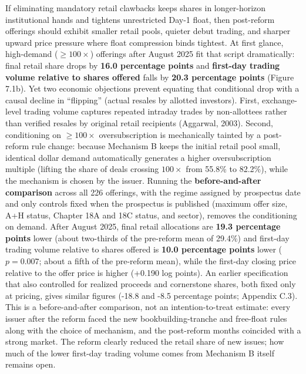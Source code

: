 \documentclass[11pt,letterpaper]{article}
\begin{document}
If eliminating mandatory retail clawbacks keeps shares in longer-horizon institutional hands and tightens unrestricted Day-1 float, then post-reform offerings should exhibit smaller retail pools, quieter debut trading, and sharper upward price pressure where float compression binds tightest. At first glance, high-demand ($\ge 100\times$) offerings after August 2025 fit that script dramatically: final retail share drops by \textbf{16.0 percentage points} and \textbf{first-day trading volume relative to shares offered} falls by \textbf{20.3 percentage points} (Figure 7.1b). Yet two economic objections prevent equating that conditional drop with a causal decline in ``flipping'' (actual resales by allotted investors). First, exchange-level trading volume captures repeated intraday trades by non-allottees rather than verified resales by original retail recipients (Aggarwal, 2003). Second, conditioning on $\ge 100\times$ oversubscription is mechanically tainted by a post-reform rule change: because Mechanism B keeps the initial retail pool small, identical dollar demand automatically generates a higher oversubscription multiple (lifting the share of deals crossing $100\times$ from 55.8\% to 82.2\%), while the mechanism is chosen by the issuer. Running the \textbf{before-and-after comparison} across all 226 offerings, with the regime assigned by prospectus date and only controls fixed when the prospectus is published (maximum offer size, A+H status, Chapter 18A and 18C status, and sector), removes the conditioning on demand. After August 2025, final retail allocations are \textbf{19.3 percentage points} lower (about two-thirds of the pre-reform mean of 29.4\%) and first-day trading volume relative to shares offered is \textbf{10.0 percentage points} lower ($p = 0.007$; about a fifth of the pre-reform mean), while the first-day closing price relative to the offer price is higher (+0.190 log points). An earlier specification that also controlled for realized proceeds and cornerstone shares, both fixed only at pricing, gives similar figures (-18.8 and -8.5 percentage points; Appendix C.3). This is a before-and-after comparison, not an intention-to-treat estimate: every issuer after the reform faced the new bookbuilding-tranche and free-float rules along with the choice of mechanism, and the post-reform months coincided with a strong market. The reform clearly reduced the retail share of new issues; how much of the lower first-day trading volume comes from Mechanism B itself remains open.
\end{document}
